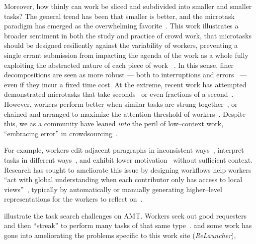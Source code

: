 \documentclass[trackingWork]{subfiles}
\begin{document}
Moreover,
how thinly can work be sliced and subdivided into smaller and smaller tasks? 
The general trend has been that smaller is better,
and the microtask paradigm has emerged as the overwhelming favorite~\cite{selfsourcingTeevan2014,selfsourcingTeevan2016}.
This work illustrates a broader sentiment in both the study and practice
of crowd work,
that microtasks should be designed resiliently against the variability of workers,
preventing a single errant submission from impacting the agenda of the work as a whole %
fully exploiting the abstracted nature of each piece of work
~\cite{interruptionIqbal,delayAndOrderLasecki,vaish2014low}.
In this sense,
finer decompositions are seen as more robust
--- both to interruptions and errors~\cite{cheng2015break} ---
even if they incur a fixed time cost.
At the extreme,
recent work has attempted demonstrated
microtasks that take seconds~\cite{Vaish:2014:TCC:2611222.2556996,Cai:2015:WLW:2702123.2702267}
or even fractions of a second~\cite{embracingErrorKrishna}.
However,
workers perform better when similar tasks are strung together~\cite{delayAndOrderLasecki},
or
chained and arranged to maximize the attention threshold of workers~\cite{Cai:2016:CRI:2858036.2858237}.
Despite this,
we as a community have leaned \textit{into} the peril of
low--context work, ``embracing error'' in crowdsourcing~\cite{embracingErrorKrishna}.


For example,
workers edit adjacent paragraphs in inconsistent ways~\cite{bernsteinSoylent,Kim2017},
interpret tasks in different ways~\cite{kairam2016parting},
and exhibit lower motivation~\cite{Kinnaird:2012:WTM:2389176.2389219} without sufficient context.
Research has sought to ameliorate this issue by
designing workflows help workers ``act with global understanding when
each contributor only has access to local views''~\cite{verroios2014context},
typically by automatically or manually generating higher--level representations
for the workers to reflect on~\cite{chilton2013cascade,verroios2014context,Kim2017}.

\citeauthor{taskSearch} illustrate the task search challenges on AMT.
Workers seek out good requesters~\cite{martin2014being} and then 
``streak'' to perform many tasks of that same type~\cite{taskSearch}.
and some work has gone into ameliorating the problems specific to this work site (\textit{ReLauncher}),
\end{document}
